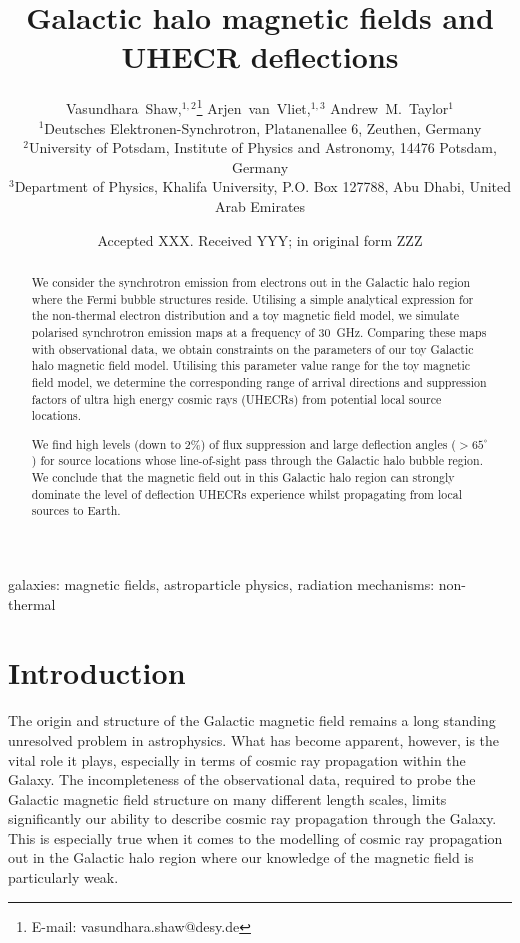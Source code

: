 \documentclass[usenatbib]{mnras}
\title{Galactic halo magnetic fields and UHECR deflections}
\author[V.~Shaw et al.]{
Vasundhara~Shaw,$^{1,2}$\thanks{E-mail: vasundhara.shaw@desy.de}
Arjen~van~Vliet,$^{1,3}$
Andrew~M.~Taylor$^{1}$
\\
$^{1}$Deutsches Elektronen-Synchrotron, Platanenallee 6, Zeuthen, Germany \\ %
$^{2}$University of Potsdam, Institute of Physics and Astronomy, 14476 Potsdam, Germany \\
$^{3}$Department of Physics, Khalifa University, P.O. Box 127788, Abu Dhabi, United Arab Emirates
}
\date{Accepted XXX. Received YYY; in original form ZZZ}
\begin{document}
\maketitle

\begin{abstract}
We consider the synchrotron emission from electrons out in the Galactic halo region where the Fermi bubble structures reside. Utilising a simple analytical expression for the non-thermal electron distribution and a toy magnetic field model, we simulate polarised synchrotron emission maps at a frequency of 30~GHz. Comparing these maps with observational data, we obtain constraints on the parameters of our toy Galactic halo magnetic field model. Utilising this parameter value range for the toy magnetic field model, we determine the corresponding range of arrival directions and suppression factors of ultra high energy cosmic rays (UHECRs) from potential local source locations.

We find high levels (down to 2\%) of flux suppression and large deflection angles ($>65^{\circ}$) for source locations whose line-of-sight pass through the Galactic halo bubble region. We conclude that the magnetic field out in this Galactic halo region can strongly dominate the level of deflection UHECRs experience whilst propagating from local sources to Earth.
\end{abstract}

\begin{keywords}
galaxies: magnetic fields, astroparticle physics, radiation mechanisms: non-thermal
\end{keywords}


\section{Introduction}
\label{Introducion}

The origin and structure of the Galactic magnetic field remains a long standing unresolved problem in astrophysics. What has become apparent, however, is the vital role it plays, especially in terms of cosmic ray propagation within the Galaxy. The incompleteness of the observational data, required to probe the Galactic magnetic field structure on many different length scales, limits significantly our ability to describe cosmic ray propagation through the Galaxy. This is especially true when it comes to the modelling of cosmic ray propagation out in the Galactic halo region where our knowledge of the magnetic field is particularly weak.
\end{document}
